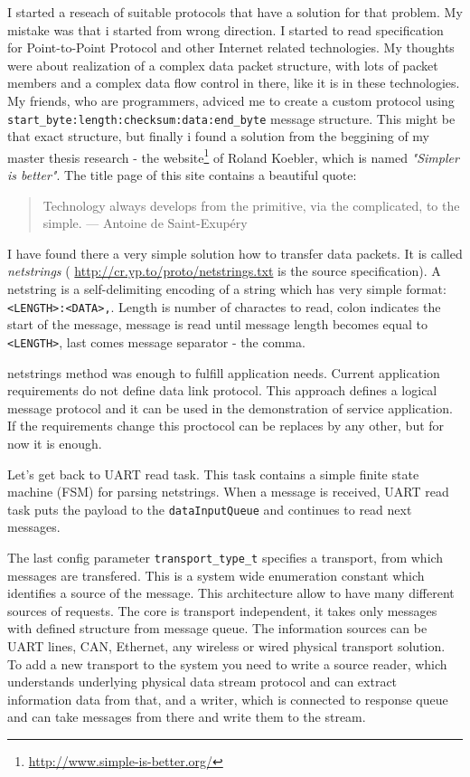 I started a reseach of suitable protocols that have a solution for that problem.
My mistake was that i started from wrong direction.
I started to read
specification for Point-to-Point Protocol and other Internet related
technologies.
My thoughts were about realization of a complex data packet structure, with lots
of packet members and a complex data flow control in there, like it is in these
technologies. My friends, who are programmers, adviced me to create a custom
protocol using \texttt{\mbox{start_byte:length:checksum:data:end_byte}} message
structure. This might be that exact structure, but finally i found a solution
from the beggining of my master thesis research - the
website\footnote{\url{http://www.simple-is-better.org/}} of Roland Koebler, which is named \textit{"Simpler is better"}.
The title page of this site contains a beautiful quote:
\begin{quotation} 
Technology always develops from the primitive, via the complicated, to the
simple. \newline
— Antoine de Saint-Exupéry
\end{quotation}

I have found there a very simple solution how to transfer data packets. It is
called \textit{netstrings} ( \url{http://cr.yp.to/proto/netstrings.txt} is the
source specification). 
A netstring is a self-delimiting encoding of a string
which has very simple format: \texttt{<LENGTH>:<DATA>,}. Length is number of
charactes to read, colon indicates the start of the message, message is read
until message length becomes equal to \texttt{<LENGTH>}, last comes message
separator - the comma.

netstrings method was enough to fulfill application needs. 
Current application requirements do not define data link protocol.
This approach defines  a logical message protocol and it can be used in the
demonstration of service application. If the requirements change this proctocol
can be replaces by any other, but for now it is enough.


Let's get back to UART read task. This task contains a simple finite state
machine (FSM) for parsing netstrings. When a message is received, UART read task
puts the payload to the \texttt{dataInputQueue} and continues to read next
messages.

The last config parameter \texttt{transport\_type\_t} specifies a transport,
from which messages are transfered.
This is a system wide enumeration constant which identifies a source of the
message. This architecture allow to have many different sources of requests. The
core is transport independent, it takes only messages with defined structure
from message queue. The information sources can be UART lines, \gls{CAN},
Ethernet, any wireless or wired physical transport solution. 
To add a new transport to the system you need
to write a source reader, which understands underlying physical data stream
protocol and can extract information data from that, and a writer, which is
connected to response queue and can take messages from there and write them to
the stream.


